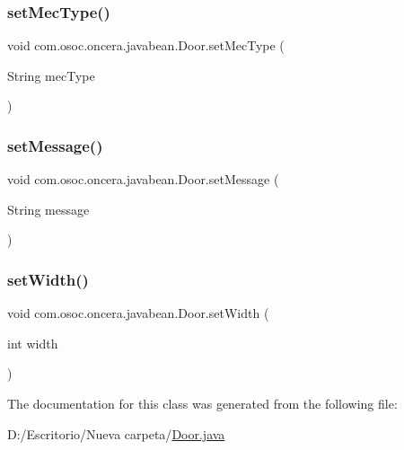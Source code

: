 \mbox{\label{classcom_1_1osoc_1_1oncera_1_1javabean_1_1_door_aea84e2341ca107746dc0323a941081cf}} 
\subsubsection{\texorpdfstring{setMecType()}{setMecType()}}
{\footnotesize\ttfamily void com.\+osoc.\+oncera.\+javabean.\+Door.\+set\+Mec\+Type (\begin{DoxyParamCaption}\item[{String}]{mec\+Type }\end{DoxyParamCaption})}

\mbox{\label{classcom_1_1osoc_1_1oncera_1_1javabean_1_1_door_a669b8120c9b2d0758ce4240e3a845516}} 
\subsubsection{\texorpdfstring{setMessage()}{setMessage()}}
{\footnotesize\ttfamily void com.\+osoc.\+oncera.\+javabean.\+Door.\+set\+Message (\begin{DoxyParamCaption}\item[{String}]{message }\end{DoxyParamCaption})}

\mbox{\label{classcom_1_1osoc_1_1oncera_1_1javabean_1_1_door_a6beddbb6f01ced78ac33287a19897451}} 
\subsubsection{\texorpdfstring{setWidth()}{setWidth()}}
{\footnotesize\ttfamily void com.\+osoc.\+oncera.\+javabean.\+Door.\+set\+Width (\begin{DoxyParamCaption}\item[{int}]{width }\end{DoxyParamCaption})}



The documentation for this class was generated from the following file\+:\begin{DoxyCompactItemize}
\item 
D\+:/\+Escritorio/\+Nueva carpeta/\mbox{\hyperlink{_door_8java}{Door.\+java}}\end{DoxyCompactItemize}
